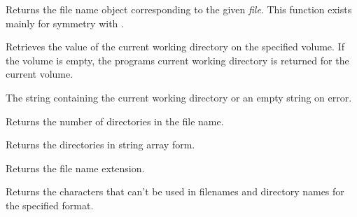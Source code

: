 


\label{wxfilenamefilename}


Returns the file name object corresponding to the given {\it file}. This
function exists mainly for symmetry with .


\label{wxfilenamegetcwd}


Retrieves the value of the current working directory on the specified volume. If
the volume is empty, the programs current working directory is returned for the
current volume.


The string containing the current working directory or an empty string on
error.



\label{wxfilenamegetdircount}


Returns the number of directories in the file name.

\label{wxfilenamegetdirs}


Returns the directories in string array form.

\label{wxfilenamegetext}


Returns the file name extension.

\label{wxfilenamegetforbiddenchars}


Returns the characters that can't be used in filenames and directory names for the specified format.

\label{wxfilenamegetformat}

